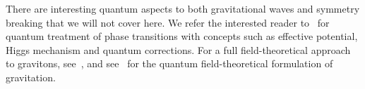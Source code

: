 





    There are interesting quantum aspects to both gravitational waves and symmetry breaking that we will not cover here. We refer the interested reader to~\citet[~11,~12,~20~\&~22]{peskinIntroductionQuantumField1995} for quantum treatment of phase transitions with concepts such as effective potential, Higgs mechanism and quantum corrections. For a full field-theoretical approach to gravitons, see~\citet[~2]{maggioreGravitationalWavesVol2007}, and see~\citet{feynmanFeynmanLecturesGravitation1995} for the quantum field-theoretical formulation of gravitation. %
